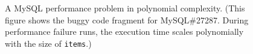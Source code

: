 \begin{figure}
\centering
{}
  \mbox{}
  \vspace{-0.1in}
\caption{A MySQL performance problem in polynomial complexity.
\footnotesize{(This figure shows the buggy code fragment for MySQL\#27287.
   During performance failure runs,
   the execution time scales polynomially with the size of \texttt{items}.)}}
\vspace{-0.05in}
\label{fig:mysql27287}
\vspace{-0.15in}
\end{figure}